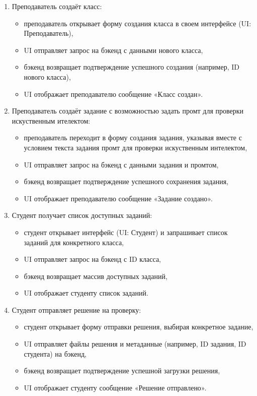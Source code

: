 \begin{enumerate}
    \item Преподаватель создаёт класс:
    \begin{itemize}
        \item преподаватель открывает форму создания класса в своем интерфейсе (UI: Преподаватель),
        \item UI отправляет запрос на бэкенд с данными нового класса,
        \item бэкенд возвращает подтверждение успешного создания (например, ID нового класса),
        \item UI отображает преподавателю сообщение «Класс создан».
    \end{itemize}

    \item Преподаватель создаёт задание с возможностью задать промт для проверки искуственным ителектом:
    \begin{itemize}
        \item преподаватель переходит в форму создания задания, указывая вместе с условием текста задания промт для проверки искуственным интелектом,
        \item UI отправляет запрос на бэкенд с данными задания и промтом,
        \item бэкенд возвращает подтверждение успешного сохранения задания,
        \item UI отображает преподавателю сообщение «Задание создано».
    \end{itemize}

    \item Студент получает список доступных заданий:
    \begin{itemize}
        \item студент открывает интерфейс (UI: Студент) и запрашивает список заданий для конкретного класса,
        \item UI отправляет запрос на бэкенд с ID класса,
        \item бэкенд возвращает массив доступных заданий,
        \item UI отображает студенту список заданий.
    \end{itemize}

    \item Студент отправляет решение на проверку:
    \begin{itemize}
        \item студент открывает форму отправки решения, выбирая конкретное задание,
        \item UI отправляет файлы решения и метаданные (например, ID задания, ID студента) на бэкенд,
        \item бэкенд возвращает подтверждение успешной загрузки решения,
        \item UI отображает студенту сообщение «Решение отправлено».
    \end{itemize}


\end{enumerate}
